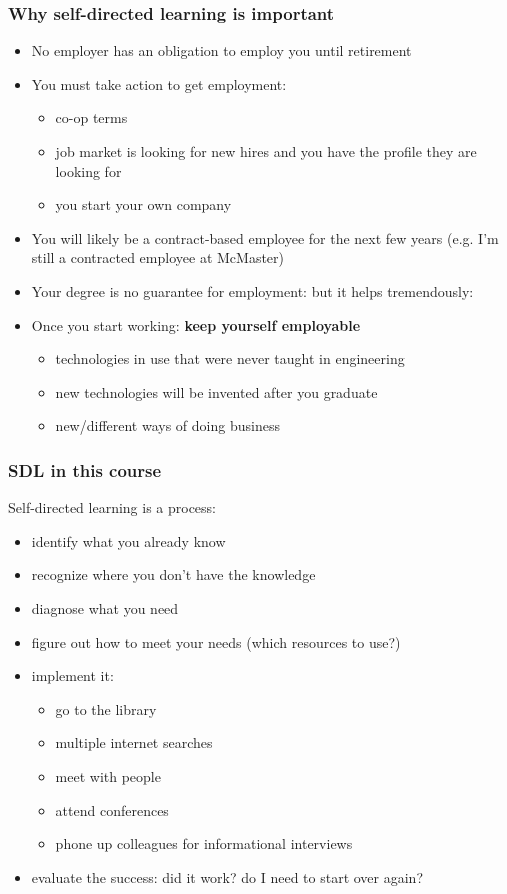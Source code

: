 \begin{frame}\frametitle{Why self-directed learning is important}
	\begin{itemize}
		\item	No employer has an obligation to employ you until retirement
		\item	You must take action to get employment:
		\begin{itemize}
			\item	co-op terms
			\item	job market is looking for new hires and you have the profile they are looking for
			\item	you start your own company
		\end{itemize}
		\pause
		\item	You will likely be a contract-based employee for the next few years (e.g. I'm still a contracted employee at McMaster)
		\item	Your degree is no guarantee for employment: but it helps tremendously: {}
		\pause
		\item	Once you start working: \textbf{keep yourself employable}
		\begin{itemize}
			\item	technologies in use that were never taught in engineering
			\item	new technologies will be invented after you graduate
			\item	new/different ways of doing business			
		\end{itemize}
	\end{itemize}
\end{frame}

\begin{frame}\frametitle{SDL in this course}
	Self-directed learning is a process: 
	\begin{itemize}
		\item	identify what you already know
		\item	recognize where you don't have the knowledge
		\item	diagnose what you need
		\item	figure out how to meet your needs (which resources to use?)
		\item	implement it: 
		\begin{itemize}
			\item	go to the library
			\item	multiple internet searches
			\item	meet with people
			\item	attend conferences
			\item	phone up colleagues for informational interviews
		\end{itemize}
		\item	evaluate the success: did it work? do I need to start over again?
	\end{itemize}

\end{frame}

